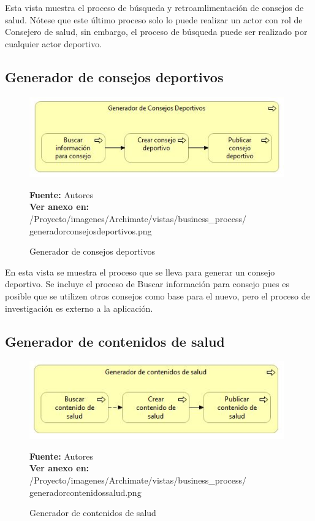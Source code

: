 Esta vista muestra el proceso de búsqueda y retroamlimentación de consejos de salud. Nótese que este último proceso solo lo puede realizar un actor con rol de Consejero de salud, sin embargo, el proceso de búsqueda puede ser realizado por cualquier actor deportivo.

\subsection{Generador de consejos deportivos}

\begin{figure}[!htb]
  \begin{center}
    \includegraphics[width=11cm]{./imagenes/Archimate/vistas/business_process/generadorconsejosdeportivos.png}
    \caption{Generador de consejos deportivos}
    \label{fig:BP_GeneradorConsejosDeportivos}
    \textbf{Fuente:}  Autores \\
     \textbf{Ver anexo en:} /Proyecto/imagenes/Archimate/vistas/business\_process/
     generadorconsejosdeportivos.png
  \end{center}
\end{figure}

En esta vista se muestra el proceso que se lleva para generar un consejo deportivo. Se incluye el proceso de Buscar información para consejo pues es posible que se utilizen otros consejos como base para el nuevo, pero el proceso de investigación es externo a la aplicación.

\subsection{Generador de contenidos de salud}

\begin{figure}[!htb]
  \begin{center}
    \includegraphics[width=11cm]{./imagenes/Archimate/vistas/business_process/generadorcontenidossalud.png}
    \caption{Generador de contenidos de salud}
    \label{fig:BP_GeneradorContenidosSalud}
    \textbf{Fuente:} Autores \\
     \textbf{Ver anexo en:} /Proyecto/imagenes/Archimate/vistas/business\_process/
     generadorcontenidossalud.png
  \end{center}
\end{figure}

